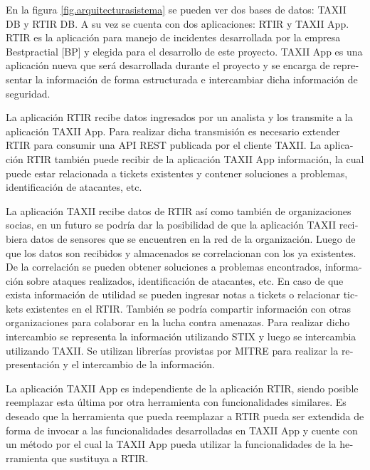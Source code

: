 	

	\foreignlanguage{spanish}{En la figura \ref{fig.arquitecturasistema} se pueden ver dos bases de datos: TAXII DB y RTIR DB. A su vez se cuenta con dos
		aplicaciones: RTIR y TAXII App. RTIR es la aplicación para manejo de incidentes desarrollada por la empresa
		Bestpractial [BP] y elegida para el desarrollo de este proyecto. TAXII App es una aplicación nueva que será
		desarrollada durante el proyecto y se encarga de representar la información de forma estructurada e intercambiar dicha
		información de seguridad.}
    \bigskip
	
	\foreignlanguage{spanish}{La aplicación RTIR recibe datos ingresados por un analista y los transmite a la aplicación
		TAXII App. Para realizar dicha transmisión es necesario extender RTIR para consumir una API REST publicada por el
		cliente TAXII. La aplicación RTIR también puede recibir de la aplicación TAXII App información, la cual puede
		estar relacionada a tickets existentes y contener soluciones a problemas, identificación de atacantes, etc.}
	
	
	\bigskip
	
	\foreignlanguage{spanish}{La aplicación TAXII recibe datos de RTIR así como también de organizaciones socias, en un
		futuro se podría dar la posibilidad de que la aplicación TAXII recibiera datos de sensores que se encuentren en la red
		de la organización. Luego de que los datos son recibidos y almacenados se correlacionan con los ya existentes. De la
		correlación se pueden obtener soluciones a problemas encontrados, información sobre ataques realizados, identificación
		de atacantes, etc. En caso de que exista información de utilidad se pueden ingresar notas a tickets o relacionar
		tickets existentes en el RTIR.}
		\bigskip
	\foreignlanguage{spanish}{También se podría compartir información con otras organizaciones para colaborar en la lucha
		contra amenazas. Para realizar dicho intercambio se representa la información utilizando STIX y luego se intercambia
		utilizando TAXII. Se utilizan librerías provistas por MITRE para realizar la representación y el intercambio de la
		información.}
	
	
	\bigskip
	
	\foreignlanguage{spanish}{La aplicación TAXII App es independiente de la aplicación RTIR, siendo posible reemplazar esta
		última por otra herramienta con funcionalidades similares. Es deseado que la herramienta que pueda reemplazar a RTIR
		pueda ser extendida de forma de invocar a las funcionalidades desarrolladas en TAXII App y cuente con un método por el
		cual la TAXII App pueda utilizar la funcionalidades de la herramienta que sustituya a RTIR.}
	

